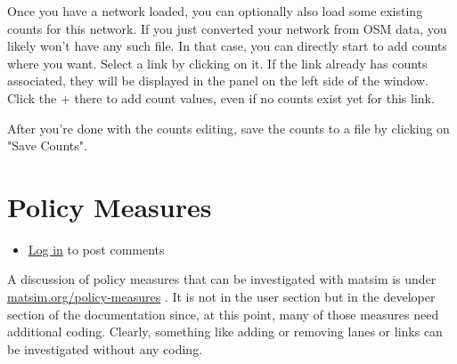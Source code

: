 \documentclass[a4paper,11pt]{report}
\begin{document}
Once you have a network loaded, you can optionally also load some  existing counts for this network. If you just converted your network  from OSM data, you likely won't have any such file. In that case, you  can directly start to add counts where you want. Select a link by  clicking on it. If the link already has counts associated, they will be  displayed in the panel on the left side of the window. Click the + there  to add count values, even if no counts exist yet for this link.

After you're done with the counts editing, save the counts to a file by clicking on "Save Counts".


\chapter{Policy Measures}
\begin{itemize}
	\item \href{http://www.matsim.org/user/login?destination=comment/reply/563%23comment-form}{Log in} to post comments
\end{itemize}

A discussion of policy measures that can be investigated with matsim is under \href{http://matsim.org/policy-measures}{matsim.org/policy-measures}  . It is not in the user section but in the developer section of  the documentation since, at this point, many of those measures need  additional coding. Clearly, something like adding or removing lanes or  links can be investigated without any coding.
\end{document}
